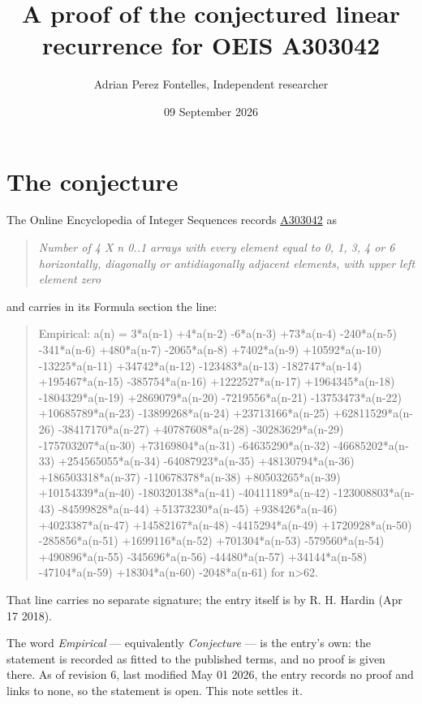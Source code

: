 \documentclass[11pt]{article}
\title{A proof of the conjectured linear recurrence for OEIS A303042}
\author{Adrian Perez Fontelles, Independent researcher}
\date{09 September 2026}
\theoremstyle{definition}
\begin{document}
\maketitle
\section{The conjecture}

The Online Encyclopedia of Integer Sequences records \href{https://oeis.org/A303042}{A303042} as

\begin{quote}\itshape Number of 4 X n 0..1 arrays with every element equal to 0, 1, 3, 4 or 6 horizontally, diagonally or antidiagonally adjacent elements, with upper left element zero\end{quote}

and carries in its Formula section the line:

\begin{quote}\ttfamily Empirical: a(n) = 3*a(n-1) +4*a(n-2) -6*a(n-3) +73*a(n-4) -240*a(n-5) -341*a(n-6) +480*a(n-7) -2065*a(n-8) +7402*a(n-9) +10592*a(n-10) -13225*a(n-11) +34742*a(n-12) -123483*a(n-13) -182747*a(n-14) +195467*a(n-15) -385754*a(n-16) +1222527*a(n-17) +1964345*a(n-18) -1804329*a(n-19) +2869079*a(n-20) -7219556*a(n-21) -13753473*a(n-22) +10685789*a(n-23) -13899268*a(n-24) +23713166*a(n-25) +62811529*a(n-26) -38417170*a(n-27) +40787608*a(n-28) -30283629*a(n-29) -175703207*a(n-30) +73169804*a(n-31) -64635290*a(n-32) -46685202*a(n-33) +254565055*a(n-34) -64087923*a(n-35) +48130794*a(n-36) +186503318*a(n-37) -110678378*a(n-38) +80503265*a(n-39) +10154339*a(n-40) -180320138*a(n-41) -40411189*a(n-42) -123008803*a(n-43) -84599828*a(n-44) +51373230*a(n-45) +938426*a(n-46) +4023387*a(n-47) +14582167*a(n-48) -4415294*a(n-49) +1720928*a(n-50) -285856*a(n-51) +1699116*a(n-52) +701304*a(n-53) -579560*a(n-54) +490896*a(n-55) -345696*a(n-56) -44480*a(n-57) +34144*a(n-58) -47104*a(n-59) +18304*a(n-60) -2048*a(n-61) for n>62.\end{quote}

That line carries no separate signature; the entry itself is by R. H. Hardin (Apr 17 2018).

The word {\itshape Empirical} --- equivalently {\itshape Conjecture} --- is the entry's own: the statement is recorded as fitted to the published terms, and no proof is given there. As of revision 6, last modified May 01 2026, the entry records no proof and links to none, so the statement is open. This note settles it.
\end{document}
